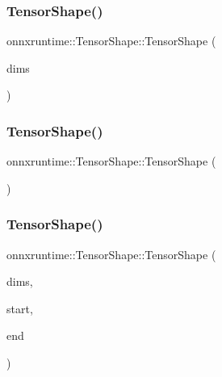 \subsubsection{\texorpdfstring{Tensor\+Shape()}{TensorShape()}\hspace{0.1cm}{\footnotesize\ttfamily [3/5]}}
{\footnotesize\ttfamily onnxruntime\+::\+Tensor\+Shape\+::\+Tensor\+Shape (\begin{DoxyParamCaption}\item[{const std\+::vector$<$ int64\+\_\+t $>$ \&}]{dims }\end{DoxyParamCaption})}

\mbox{\label{classonnxruntime_1_1TensorShape_a2c8f0b8703f40eff16e086b43138d8aa}} 
\subsubsection{\texorpdfstring{Tensor\+Shape()}{TensorShape()}\hspace{0.1cm}{\footnotesize\ttfamily [4/5]}}
{\footnotesize\ttfamily onnxruntime\+::\+Tensor\+Shape\+::\+Tensor\+Shape (\begin{DoxyParamCaption}\item[{const \mbox{\hyperlink{classonnxruntime_1_1TensorShape}{Tensor\+Shape}} \&}]{ }\end{DoxyParamCaption})\hspace{0.3cm}{\ttfamily [default]}}

\mbox{\label{classonnxruntime_1_1TensorShape_a4ae80dbb6c8da7a2cb796d25c0e5bf4d}} 
\subsubsection{\texorpdfstring{Tensor\+Shape()}{TensorShape()}\hspace{0.1cm}{\footnotesize\ttfamily [5/5]}}
{\footnotesize\ttfamily onnxruntime\+::\+Tensor\+Shape\+::\+Tensor\+Shape (\begin{DoxyParamCaption}\item[{const std\+::vector$<$ int64\+\_\+t $>$ \&}]{dims,  }\item[{\mbox{\hyperlink{mlasi_8h_a503efbc1c6e50825320ad909366b78ab}{size\+\_\+t}}}]{start,  }\item[{\mbox{\hyperlink{mlasi_8h_a503efbc1c6e50825320ad909366b78ab}{size\+\_\+t}}}]{end }\end{DoxyParamCaption})}




